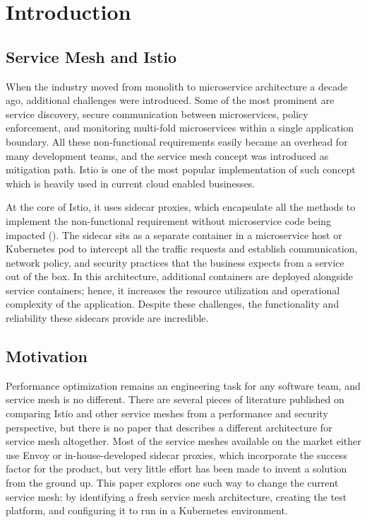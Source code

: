 \section{Introduction}
\subsection{Service Mesh and Istio}
When the industry moved from monolith to microservice architecture a decade ago, additional challenges were introduced. Some of the most prominent are service discovery, secure communication between microservices, policy enforcement, and monitoring multi-fold microservices within a single application boundary. All these non-functional requirements easily became an overhead for many development teams, and the service mesh concept was introduced as mitigation path. Istio is one of the most popular implementation of such concept which is heavily used in current cloud enabled businesses.

At the core of Istio, it uses sidecar proxies, which encapsulate all the methods to implement the non-functional requirement without microservice code being impacted (\cite{techcrunch2022}). The sidecar sits as a separate container in a microservice host or Kubernetes pod to intercept all the traffic requests and establish communication, network policy, and security practices that the business expects from a service out of the box. In this architecture, additional containers are deployed alongside service containers; hence, it increases the resource utilization and operational complexity of the application. Despite these challenges, the functionality and reliability these sidecars provide are incredible.

\subsection{Motivation}
Performance optimization remains an engineering task for any software team, and service mesh is no different. There are several pieces of literature published on comparing Istio and other service meshes from a performance and security perspective, but there is no paper that describes a different architecture for service mesh altogether. Most of the service meshes available on the market either use Envoy or in-house-developed sidecar proxies, which incorporate the success factor for the product, but very little effort has been made to invent a solution from the ground up. This paper explores one such way to change the current service mesh: by identifying a fresh service mesh architecture, creating the test platform, and configuring it to run in a Kubernetes environment.

